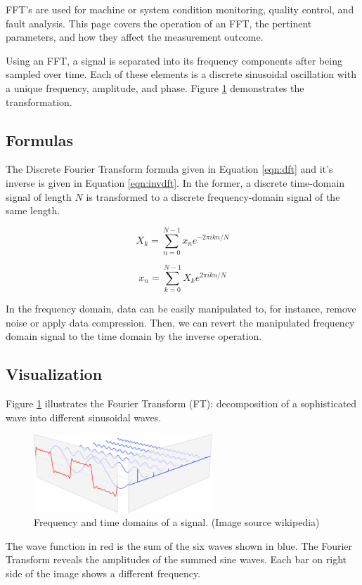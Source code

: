 \documentclass[a4paper, 12pt]{scrartcl}
\begin{document}
FFT's are used for machine or system condition monitoring, quality control, and fault analysis.
This page covers the operation of an FFT, the pertinent parameters, and how they affect the measurement outcome.

Using an FFT, a signal is separated into its frequency components after being sampled over time.
Each of these elements is a discrete sinusoidal oscillation with a unique frequency, amplitude, and phase.
Figure \ref{fig:fourier} demonstrates the transformation.

\subsection{Formulas}

The Discrete Fourier Transform formula given in Equation \ref{eqn:dft} and it's inverse is given in Equation \ref{eqn:invdft}.
In the former, a discrete time-domain signal of length $N$ is transformed to a discrete frequency-domain signal of the same length.

\begin{equation}
  \label{eqn:dft}
  X_k = \sum_{n=0}^{N-1} x_n e^{-2 \pi i k n / N}
\end{equation}

\begin{equation}
  \label{eqn:invdft}
  x_n = \sum_{k=0}^{N-1} X_k e^{2 \pi i k n / N}
\end{equation}

 
In the frequency domain, data can be easily manipulated to, for instance, remove noise or apply data compression.
Then, we can revert the manipulated frequency domain signal to the time domain by the inverse operation.

\subsection{Visualization}

Figure \ref{fig:fourier} illustrates the Fourier Transform (FT): decomposition of a sophisticated wave into different sinusoidal waves.
\begin{figure}[H] 
  \centering
  \includegraphics[width=0.6\textwidth]{img/fourier-dimensions.png}
  \caption{Frequency and time domains of a signal. (Image source wikipedia)}
  \label{fig:fourier}
\end{figure}
The wave function in red is the sum of the six waves shown in blue.
The Fourier Transform reveals the amplitudes of the summed sine waves.
Each bar on right side of the image shows a different frequency.  
\end{document}
